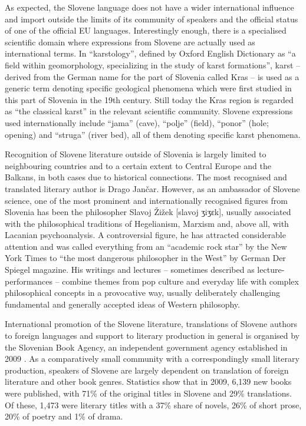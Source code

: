 \begin{multicols}{2}
As expected, the Slovene language does not have a wider international influence and import outside the limits of its community of speakers and the official status of one of the official EU languages. Interestingly enough, there is a specialised scientific domain where expressions from Slovene are actually used as international terms. In ``karstology'', defined by Oxford English Dictionary as ``a field within geomorphology, specializing in the study of karst formations'', karst – derived from the German name for the part of Slovenia called Kras – is used as a generic term denoting specific geological phenomena which were first studied in this part of Slovenia in the 19th century. Still today the Kras region is regarded as ``the classical karst'' in the relevant scientific community. Slovene expressions used internationally include ``jama'' (cave), ``polje'' (field), ``ponor'' (hole; opening) and ``struga'' (river bed), all of them denoting specific karst phenomena.

Recognition of Slovene literature outside of Slovenia is largely limited to neighbouring countries and to a certain extent to Central Europe and the Balkans, in both cases due to historical connections. The most recognised and translated literary author is Drago Jančar. However, as an ambassador of Slovene science, one of the most prominent and internationally recognised figures from Slovenia has been the philosopher Slavoj Žižek [slavoj ʒiʒɛk], usually associated with the philosophical traditions of Hegelianism, Marxism and, above all, with Lacanian psychoanalysis. A controversial figure, he has attracted considerable attention and was called everything from an “academic rock star” by the New York Times to ``the most dangerous philosopher in the West'' by German Der Spiegel magazine. His writings and lectures – sometimes described as lecture-performances – combine themes from pop culture and everyday life with complex philosophical concepts in a provocative way, usually deliberately challenging fundamental and generally accepted ideas of Western philosophy. 


International promotion of the Slovene literature, translations of Slovene authors to foreign languages and support to literary production in general is organised by the Slovenian Book Agency, an independent government agency established in 2009 \cite{JAKRS1}.  As a comparatively small community with a correspondingly small literary production, speakers of Slovene are largely dependent on translation of foreign literature and other book genres. Statistics show that in 2009, 6,139 new books were published, with 71\% of the original titles in Slovene and 29\% translations. Of these, 1,473 were literary titles with a 37\% share of novels, 26\% of short prose, 20\% of poetry and 1\% of drama. 


\end{multicols}
